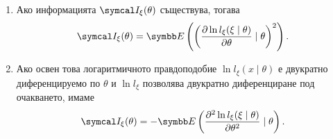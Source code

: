 \documentclass[numbers=endperiod, bibliography=totocnumbered]{scrartcl}
\begin{document}
\begin{theorem}
  \mbox{}
  \begin{enumerate}
    \item Ако информацията \( \FisherInfo_\xi(\theta) \) съществува, тогава
    \begin{equation*}
      \FisherInfo_\xi(\theta) = \Expect\left( {\left( \frac {\partial \ln l_\xi(\xi \mid \theta)} {\partial \theta} \mid \theta \right)}^2 \right).
    \end{equation*}

    \item Ако освен това логаритмичното правдоподобие \( \ln l_\xi (x \mid \theta) \) е двукратно диференцируемо по \( \theta \) и \( \ln l_\xi \) позволява двукратно диференциране под очакването, имаме
    \begin{equation*}
      \FisherInfo_\xi(\theta) = -\Expect\left( \frac {\partial^2 \ln l_\xi(\xi \mid \theta)} {\partial \theta^2} \mid \theta \right).
    \end{equation*}
  \end{enumerate}
\end{theorem}
\end{document}
